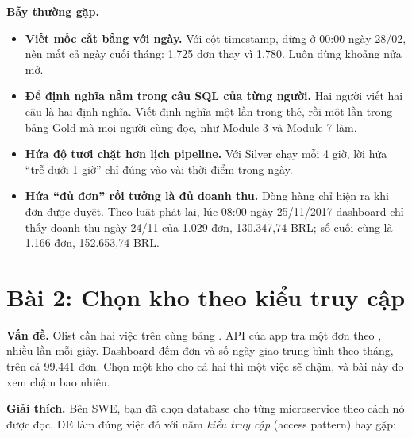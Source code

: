 \begin{luuy}
\textbf{Bẫy thường gặp.}
\begin{itemize}
  \item \textbf{Viết mốc cắt bằng  với ngày.} Với cột timestamp,  dừng ở 00:00 ngày 28/02, nên mất cả ngày cuối tháng: 1.725 đơn thay vì 1.780. Luôn dùng khoảng nửa mở.
  \item \textbf{Để định nghĩa nằm trong câu SQL của từng người.} Hai người viết hai câu là hai định nghĩa. Viết định nghĩa một lần trong thẻ, rồi một lần trong bảng Gold mà mọi người cùng đọc, như Module 3 và Module 7 làm.
  \item \textbf{Hứa độ tươi chặt hơn lịch pipeline.} Với Silver chạy mỗi 4 giờ, lời hứa ``trễ dưới 1 giờ'' chỉ đúng vào vài thời điểm trong ngày.
  \item \textbf{Hứa ``đủ đơn'' rồi tưởng là đủ doanh thu.} Dòng hàng chỉ hiện ra khi đơn được duyệt. Theo luật phát lại, lúc 08:00 ngày 25/11/2017 dashboard chỉ thấy doanh thu ngày 24/11 của 1.029 đơn, 130.347,74 BRL; số cuối cùng là 1.166 đơn, 152.653,74 BRL.
\end{itemize}
\end{luuy}

\section{Bài 2: Chọn kho theo kiểu truy cập}

\textbf{Vấn đề.} Olist cần hai việc trên cùng bảng . API của app tra một đơn theo , nhiều lần mỗi giây. Dashboard đếm đơn và số ngày giao trung bình theo tháng, trên cả 99.441 đơn. Chọn một kho cho cả hai thì một việc sẽ chậm, và bài này đo xem chậm bao nhiêu.

\textbf{Giải thích.} Bên SWE, bạn đã chọn database cho từng microservice theo cách nó được đọc. DE làm đúng việc đó với năm \textit{kiểu truy cập} (access pattern) hay gặp:

